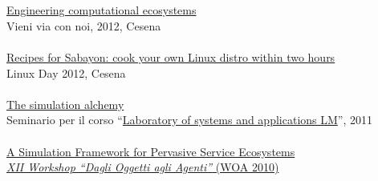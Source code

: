 \documentclass[10pt]{article}
\newcommand{\halfblankline}{\quad\vspace{-0.5\baselineskip}\pagebreak[3]}
\begin{document}
\\ \halfblankline \\
\href{https://www.slideshare.net/DanySK/engineering-computational-ecosystems}{Engineering computational ecosystems} \\
Vieni via con noi, 2012, Cesena
\\ \halfblankline \\
\href{https://www.slideshare.net/DanySK/recipes-for-sabayon-cook-your-own-linux-distro-within-two-hours}{Recipes for Sabayon: cook your own Linux distro within two hours} \\
Linux Day 2012, Cesena
\\ \halfblankline \\
\href{http://campus.unibo.it/83921/}{The simulation alchemy} \\
Seminario per il corso ``\href{http://apice.unibo.it/xwiki/bin/view/Courses/LsaLm1112}{Laboratory of systems and applications LM}'', 2011
\\ \halfblankline \\
\href{http://apice.unibo.it/xwiki/bin/view/Talks/PianiniWoa2011}{A Simulation Framework for Pervasive Service Ecosystems} \\
\href{http://www.inf.u-szeged.hu/projectdirs/saso10/}{\textit{XII Workshop ``Dagli Oggetti agli Agenti''} (WOA 2010)}
\end{document}
